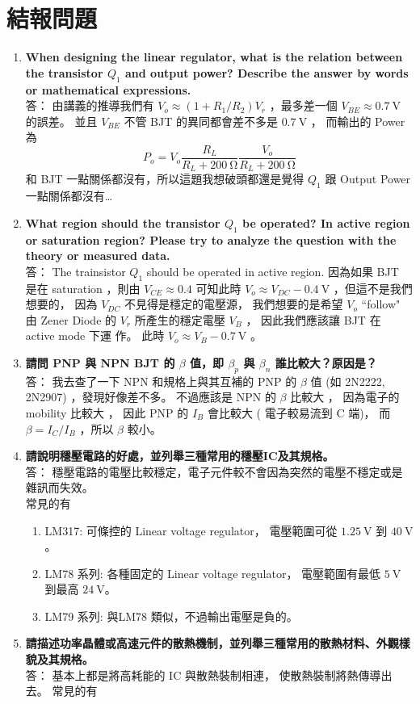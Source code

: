 \documentclass[12pt, a4paper]{article}
\begin{document}
\section{結報問題}

\begin{enumerate}[itemsep=20pt, topsep=10pt]

  \item {\bf When designing the linear regulator, what is the relation between the 
    transistor $Q_1$ and output power? Describe the answer by words or 
 mathematical expressions.   } \\[10pt]
 答： 由講義的推導我們有 $V_o \approx (1 + R_1 / R_2) V_r$ ，最多差一個 $V_{BE} \approx
 \SI{0.7}\V$ 的誤差。 並且 $V_{BE}$ 不管 BJT 的異同都會差不多是 $\SI{0.7}\V$ ， 而輸出的
 Power 為
 \[ P_o = V_o \frac{R_L}{R_L + \SI{200}\ohm} \frac{V_o}{R_L + \SI{200}\ohm} \]
 和 BJT 一點關係都沒有，所以這題我想破頭都還是覺得 $Q_1$ 跟 Output Power 一點關係都沒有…

  \item {\bf What region should the transistor $Q_1$ be operated? In active region or 
 saturation region? Please try to analyze the question with the theory or 
 measured data. } \\[10pt]
    答： The trainsistor $Q_1$ should be operated in active region. 因為如果 BJT 是在 saturation
    ，則由 $V_{CE} \approx 0.4$ 可知此時 $V_o \approx V_{DC} - \SI{0.4}\V$ ，但這不是我們想要的，
    因為 $V_{DC}$ 不見得是穩定的電壓源， 我們想要的是希望 $V_o$ ``follow"
    由 Zener Diode 的 $V_r$ 所產生的穩定電壓 $V_{B}$ ， 因此我們應該讓 BJT 在 active mode 下運
    作。 此時 $V_o \approx V_{B} - \SI{0.7}\V$ 。 

  \item {\bf 請問 PNP 與 NPN BJT 的 $\beta$ 值，即 $\beta_p$ 與 $\beta_n$ 誰比較大？原因是？ } \\[10pt]
    答： 我去查了一下 NPN 和規格上與其互補的 PNP 的 $\beta$ 值 (如 2N2222, 2N2907) ，發現好像差不多。
    不過應該是 NPN 的 $\beta$ 比較大 ， 因為電子的 mobility 比較大 ， 因此 PNP 的 $I_B$ 會比較大 (
    電子較易流到 C 端)， 而 $\beta = I_C / I_B$ ，所以 $\beta$ 較小。

  \item {\bf 請說明穩壓電路的好處，並列舉三種常用的穩壓IC及其規格。 } \\[10pt]
  答： 穩壓電路的電壓比較穩定，電子元件較不會因為突然的電壓不穩定或是雜訊而失效。\\
  常見的有
  \begin{enumerate}
    \item LM317: 可條控的 Linear voltage regulator， 電壓範圍可從 $\SI{1.25}\V$ 到 $\SI{40}\V$。
    \item LM78 系列: 各種固定的 Linear voltage regulator， 電壓範圍有最低 $\SI{5}\V$ 到最高 $\SI{24}\V$。
    \item LM79 系列: 與LM78 類似，不過輸出電壓是負的。
  \end{enumerate}
\item {\bf 請描述功率晶體或高速元件的散熱機制，並列舉三種常用的散熱材料、外觀樣貌及其規格。 } \\[10pt]
  答： 基本上都是將高耗能的 IC 與散熱裝制相連， 使散熱裝制將熱傳導出去。
  常見的有


\end{enumerate}
\end{document}
